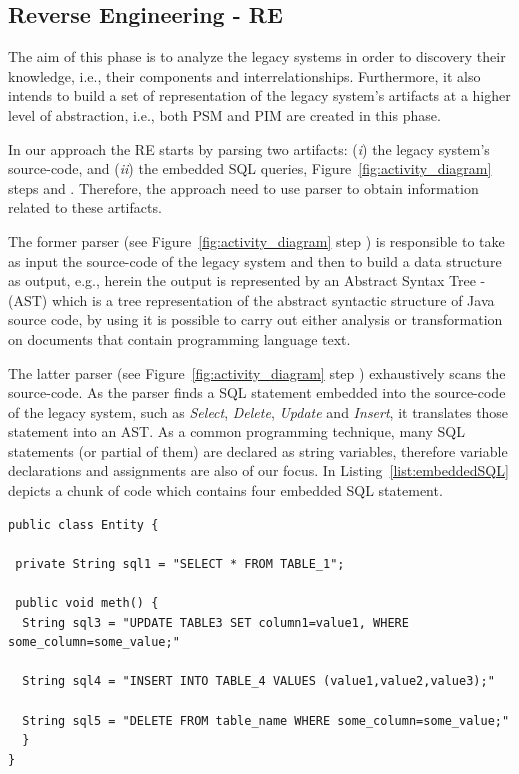 \documentclass[a4paper,twoside]{article}
\newcommand*\circled[1]{\tikz[baseline=(char.base)]{
  \node[shape=circle,draw, inner sep=0.1pt] (char) {#1};}
}
\begin{document}
\subsection{Reverse Engineering - RE} 

The aim of this phase is to analyze the legacy systems in order to discovery their knowledge, i.e., their components and interrelationships. Furthermore, it also intends to build a set of representation of the legacy system's artifacts at a higher level of abstraction, i.e., both PSM and PIM are created in this phase. 

In our approach the RE starts by parsing two artifacts: (\textit{i}) the legacy system's source-code, and (\textit{ii}) the embedded SQL queries, Figure~\ref{fig:activity_diagram} steps \circled{\textbf{A}} and \circled{\textbf{B}}. Therefore, the  approach need to use parser to obtain information related to these artifacts. 

The former parser (see Figure~\ref{fig:activity_diagram} step \circled{\textbf{A}}) is responsible to take as input the source-code of the legacy system and then to build a data structure as output, e.g., herein the output is represented by an Abstract Syntax Tree - (AST)  which is a tree representation of the abstract syntactic structure of Java source code, by using it is possible to carry out either analysis or transformation on documents that contain programming language text.


 The latter parser (see Figure~\ref{fig:activity_diagram} step \circled{\textbf{B}}) exhaustively scans the source-code. As the parser finds a SQL statement embedded into the source-code of the legacy system, such as \textit{Select}, \textit{Delete}, \textit{Update} and \textit{Insert}, it translates those statement into an AST. As a common programming technique, many SQL statements (or partial of them) are declared as string variables, therefore variable  declarations and assignments are also of our focus.
In Listing~\ref{list:embeddedSQL} depicts a chunk of code which contains four embedded SQL statement. 

\begin{lstlisting}[caption=Example of Embedded SQL, label=list:embeddedSQL, frame=lrtb, basicstyle=\tiny]
public class Entity {

 private String sql1 = "SELECT * FROM TABLE_1";

 public void meth() {
  String sql3 = "UPDATE TABLE3 SET column1=value1, WHERE some_column=some_value;"
  
  String sql4 = "INSERT INTO TABLE_4 VALUES (value1,value2,value3);"
  
  String sql5 = "DELETE FROM table_name WHERE some_column=some_value;"
  }
}
\end{lstlisting}
\end{document}
